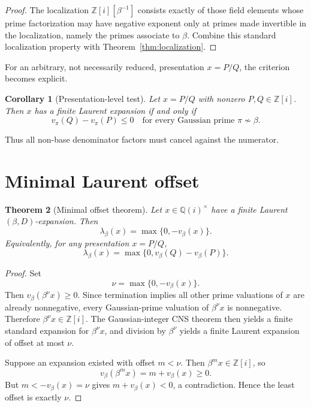 \documentclass[11pt]{article}
\newtheorem{theorem}{Theorem}[section]
\newtheorem{corollary}[theorem]{Corollary}
\theoremstyle{definition}
\newcommand{\Zi}{\mathbb{Z}[i]}
\newcommand{\Qi}{\mathbb{Q}(i)}
\begin{document}
\begin{proof}
The localization $\Zi[\beta^{-1}]$ consists exactly of those field elements whose prime factorization may have negative exponent only at primes made invertible in the localization, namely the primes associate to $\beta$.  Combine this standard localization property with Theorem~\ref{thm:localization}.
\end{proof}

For an arbitrary, not necessarily reduced, presentation $x=P/Q$, the criterion becomes explicit.

\begin{corollary}[Presentation-level test]
Let $x=P/Q$ with nonzero $P,Q\in\Zi$.  Then $x$ has a finite Laurent expansion if and only if
\begin{equation}
v_\pi(Q)-v_\pi(P)\le0
\quad
\text{for every Gaussian prime }\pi\not\sim\beta.
\label{eq:all-other-valuations}
\end{equation}
\end{corollary}

Thus all non-base denominator factors must cancel against the numerator.

\section{Minimal Laurent offset}

\begin{theorem}[Minimal offset theorem]
Let $x\in\Qi^\times$ have a finite Laurent $(\beta,D)$-expansion.  Then
\begin{equation}
\boxed{
\lambda_\beta(x)=\max\{0,-v_\beta(x)\}.
}
\label{eq:min-offset-intrinsic}
\end{equation}
Equivalently, for any presentation $x=P/Q$,
\begin{equation}
\boxed{
\lambda_\beta(x)
=
\max\{0,v_\beta(Q)-v_\beta(P)\}.
}
\label{eq:min-offset-pq}
\end{equation}
\end{theorem}

\begin{proof}
Set
\[
\nu=\max\{0,-v_\beta(x)\}.
\]
Then $v_\beta(\beta^\nu x)\ge0$.  Since termination implies all other prime valuations of $x$ are already nonnegative, every Gaussian-prime valuation of $\beta^\nu x$ is nonnegative.  Therefore $\beta^\nu x\in\Zi$.  The Gaussian-integer CNS theorem then yields a finite standard expansion for $\beta^\nu x$, and division by $\beta^\nu$ yields a finite Laurent expansion of offset at most $\nu$.

Suppose an expansion existed with offset $m<\nu$.  Then $\beta^m x\in\Zi$, so
\[
v_\beta(\beta^m x)=m+v_\beta(x)\ge0.
\]
But $m< -v_\beta(x)=\nu$ gives $m+v_\beta(x)<0$, a contradiction.  Hence the least offset is exactly $\nu$.
\end{proof}
\end{document}

